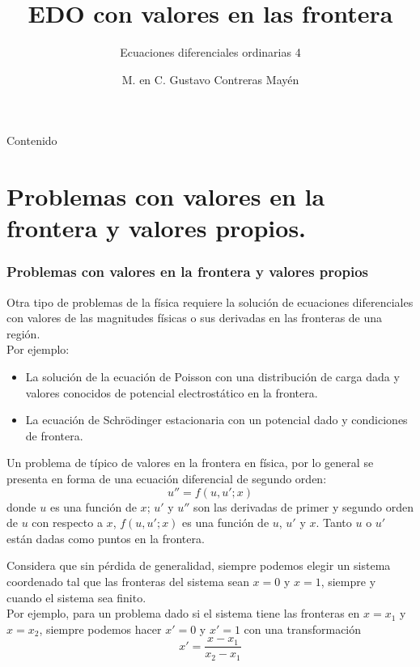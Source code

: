 

\title{EDO con valores en las frontera}
\subtitle{Ecuaciones diferenciales ordinarias 4}
\author[]{M. en C. Gustavo Contreras Mayén}

\maketitle
\fontsize{14}{14}\selectfont
{}
\begin{frame}{Contenido}
\tableofcontents[pausesections]
\end{frame}
\section{Problemas con valores en la frontera y valores propios.}
\begin{frame}
\frametitle{Problemas con valores en la frontera y valores propios}
Otra tipo de problemas de la física requiere la solución de ecuaciones diferenciales con valores de las magnitudes físicas o sus derivadas en las fronteras de una región.
\\
\medskip
\pause
Por ejemplo:
\begin{itemize}
\item La solución de la ecuación de Poisson con una  distribución de carga dada y valores conocidos de potencial electrostático en la frontera.
\item La ecuación de Schrödinger estacionaria con un potencial dado y  
condiciones de frontera.
\end{itemize}
\end{frame}
\begin{frame}
Un problema de típico de valores en la frontera en física, por lo general se presenta en forma de una ecuación diferencial de segundo orden:
\begin{equation}
u'' = f(u, u';x)
\label{eq:ecuacion1}
\end{equation} 
donde $u$ es una función de $x$; $u'$ y $u''$ son las derivadas de primer y segundo orden de $u$ con respecto a $x$, $f(u,u';x)$ es una función de $u$, $u'$ y $x$. Tanto $u$ o $u'$ están dadas como puntos en la frontera.
\end{frame}
\begin{frame}
Considera que sin pérdida de generalidad, siempre podemos elegir un sistema coordenado tal que las fronteras del sistema sean $x=0$ y $x=1$, siempre y cuando el sistema sea finito.
\\
\medskip
Por ejemplo, para un problema dado si el sistema tiene las fronteras en $x=x_{1}$ y $x=x_{2}$, siempre podemos hacer $x'=0$ y $x'=1$ con una transformación
\begin{equation}
x' = \dfrac{x-x_{1}}{x_{2} - x_{1}}
\end{equation} 
\end{frame}

